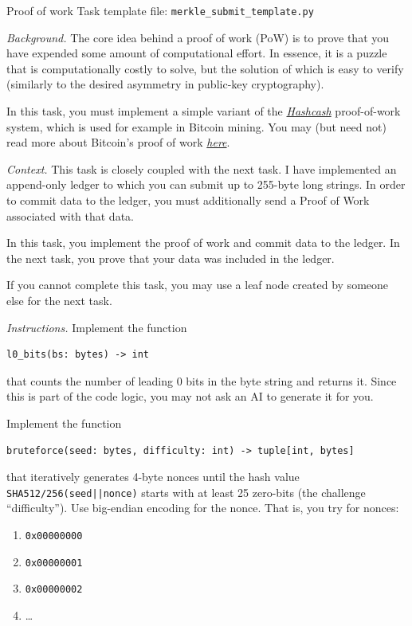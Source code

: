 \documentclass{homework}
\begin{document}
\begin{task}{Proof of work}
  Task template file: \texttt{merkle\_submit\_template.py}

  \textit{Background.}
  The core idea behind a proof of work (PoW) is to prove that you have expended some amount of computational effort.
  In essence, it is a puzzle that is computationally costly to solve, but the solution of which is easy to verify (similarly to the desired asymmetry in public-key cryptography).

  In this task, you must implement a simple variant of the \href{https://en.wikipedia.org/wiki/Hashcash}{\textit{Hashcash}} proof-of-work system, which is used for example in Bitcoin mining.
  You may (but need not) read more about Bitcoin's proof of work \href{https://en.bitcoin.it/wiki/Proof_of_work}{\textit{here}}.

  \textit{Context.}
  This task is closely coupled with the next task.
  I have implemented an append-only ledger to which you can submit up to 255-byte long strings.
  In order to commit data to the ledger, you must additionally send a Proof of Work associated with that data.

  In this task, you implement the proof of work and commit data to the ledger.
  In the next task, you prove that your data was included in the ledger.

  If you cannot complete this task, you may use a leaf node created by someone else for the next task.

  \textit{Instructions.} Implement the function
  \begin{Verbatim}
l0_bits(bs: bytes) -> int
  \end{Verbatim}
  that counts the number of leading 0 bits in the byte string and returns it.
  Since this is part of the code logic, you may not ask an AI to generate it for you.

  Implement the function
  \begin{Verbatim}
bruteforce(seed: bytes, difficulty: int) -> tuple[int, bytes]  
  \end{Verbatim}
  that iteratively generates 4-byte nonces until the hash value \texttt{SHA512/256(seed||nonce)}
  starts with at least 25 zero-bits (the challenge \enquote{difficulty}).
  Use big-endian encoding for the nonce.
  That is, you try for nonces:
  \begin{enumerate}
    \item \texttt{0x00000000}
    \item \texttt{0x00000001}
    \item \texttt{0x00000002}
    \item \dots
  \end{enumerate}


\end{task}
\end{document}
